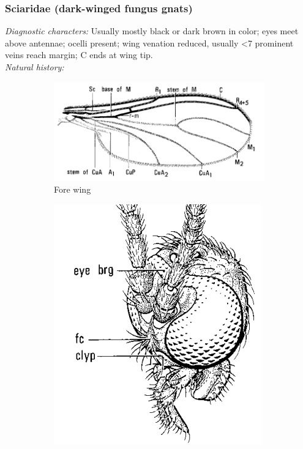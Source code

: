 \documentclass[letterpaper, 11pt]{article}
\begin{document}
\subsubsection{Sciaridae (dark-winged fungus gnats)}
\noindent{}\textit{Diagnostic characters:} Usually mostly black or dark brown in color; eyes meet above antennae; ocelli present; wing venation reduced, usually \textless7 prominent veins reach margin; C ends at wing tip.\\

\noindent{}\textit{Natural history:} \\

\begin{figure}[ht!]
    \centering
    \begin{subfigure}[ht!]{0.45\textwidth}
        \includegraphics[width=\textwidth]{SciaridWing}
        \caption{Fore wing \citep[][Fig. 15.19]{mcalpine1981manual}}
        \label{fig:sciarid1}
    \end{subfigure}
    \qquad
    \begin{subfigure}[ht!]{0.25\textwidth}
        \includegraphics[width=\textwidth]{SciaridHead}

\end{subfigure}
\end{figure}
\end{document}
